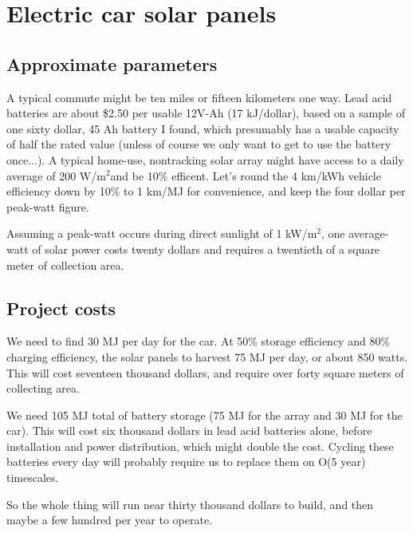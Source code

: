 \documentclass[12pt]{article}
\title{}
\author{}
\date{}
\begin{document}
\maketitle

\newcommand{\wmsq}{W/\(\mathrm{m}^2\)}

\section{Electric car solar panels}

\subsection{Approximate parameters}

A typical commute might be ten miles or fifteen kilometers one way. Lead acid batteries are about \$2.50 per usable 12V-Ah (17 kJ/dollar), based on a sample of one sixty dollar, 45 Ah battery I found, which presumably has a usable capacity of half the rated value (unless of course we only want to get to use the battery once...). A typical home-use, nontracking solar array might have access to a daily average of 200 \wmsq and be 10\% efficent. Let's round the 4 km/kWh vehicle efficiency down by 10\% to 1 km/MJ for convenience, and keep the four dollar per peak-watt figure. 

Assuming a peak-watt occurs during direct sunlight of 1 k\wmsq, one average-watt of solar power costs twenty dollars and requires a twentieth of a square meter of collection area.

\subsection{Project costs}

We need to find 30 MJ per day for the car. At 50\% storage efficiency and 80\% charging efficiency, the solar panels to harvest 75 MJ per day, or about 850 watts. This will cost seventeen thousand dollars, and require over forty square meters of collecting area.

We need 105 MJ total of battery storage (75 MJ for the array and 30 MJ for the car). This will cost six thousand dollars in lead acid batteries alone, before installation and power distribution, which might double the cost. Cycling these batteries every day will probably require us to replace them on O(5 year) timescales.

So the whole thing will run near thirty thousand dollars to build, and then maybe a few hundred per year to operate.
\end{document}
